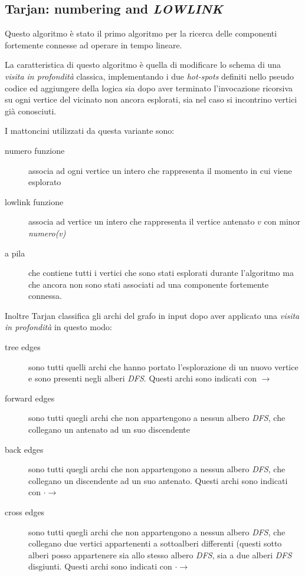 \subsection{Tarjan: numbering and \emph{LOWLINK}}
\label{subsection:tarjan-algorithm}
Questo algoritmo \`e stato il primo algoritmo per la ricerca delle
componenti fortemente connesse ad operare in tempo lineare.

La caratteristica di questo algoritmo \`e quella di modificare lo
schema di una \emph{visita in profondit\`a} classica, implementando i due
\emph{hot-spots} definiti nello pseudo codice ed aggiungere della
logica sia dopo aver terminato l'invocazione ricorsiva su ogni vertice
del vicinato non ancora esplorati, sia nel caso si incontrino vertici
gi\`a conosciuti.

I mattoncini utilizzati da questa variante sono:
\begin{description}
\item[numero funzione] associa ad ogni vertice un intero che
  rappresenta il momento in cui viene esplorato
\item[lowlink funzione] associa ad vertice un intero che rappresenta
  il vertice antenato $v$ con minor \emph{numero(v)}
\item[a pila] che contiene tutti i vertici che sono stati esplorati
  durante l'algoritmo ma che ancora non sono stati associati ad una
  componente fortemente connessa.
\end{description}

Inoltre Tarjan classifica gli archi del grafo in input dopo aver
applicato una \emph{visita in profondit\`a} in questo modo: 
\begin{description}
\item[tree edges] sono tutti quelli archi che hanno portato
  l'esplorazione di un nuovo vertice e sono presenti negli alberi
  \emph{DFS}. Questi archi sono indicati con $\rightarrow$
\item[forward edges] sono tutti quegli archi che non appartengono a
  nessun albero \emph{DFS}, che collegano un antenato ad un suo
  discendente
\item[back edges] sono tutti quegli archi che non appartengono a
  nessun albero \emph{DFS}, che collegano un discendente ad un suo
  antenato. Questi archi sono indicati con $\cdot\rightarrow$
\item[cross edges] sono tutti quegli archi che non appartengono a
  nessun albero \emph{DFS}, che collegano due vertici appartenenti a
  sottoalberi differenti (questi sotto alberi posso appartenere sia
  allo stesso albero \emph{DFS}, sia a due alberi \emph{DFS}
  disgiunti. Questi archi sono indicati con $\cdot\rightarrow$
\end{description}


